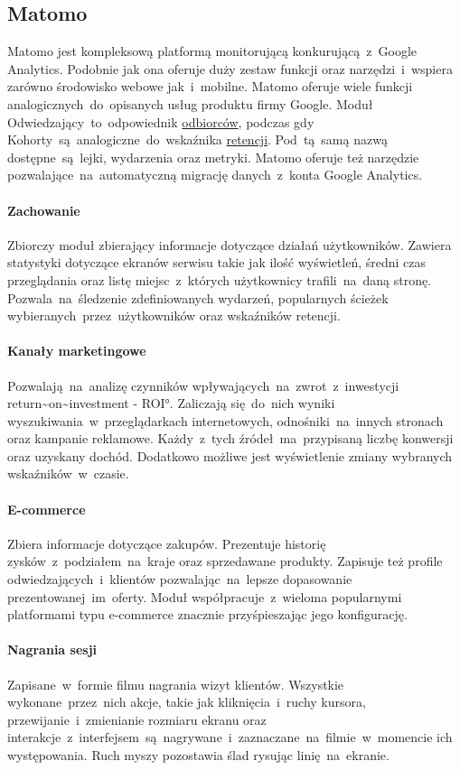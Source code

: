 \subsection{Matomo}
\label{sec:matomo}
Matomo jest kompleksową platformą monitorującą konkurującą~z~Google Analytics. Podobnie jak ona oferuje duży zestaw funkcji oraz narzędzi~i~wspiera zarówno środowisko webowe jak~i~mobilne. Matomo oferuje wiele funkcji analogicznych~do~opisanych usług produktu firmy Google. Moduł Odwiedzający~to~odpowiednik \hyperref[par:ga-audiences]{odbiorców}, podczas gdy Kohorty~są~analogiczne~do~wskaźnika \hyperref[par:ga-retention]{retencji}. Pod~tą~samą nazwą dostępne~są~lejki, wydarzenia oraz metryki. Matomo oferuje też narzędzie pozwalające~na~automatyczną migrację danych~z~konta Google Analytics.

\paragraph{Zachowanie}
Zbiorczy moduł zbierający informacje dotyczące działań użytkowników. Zawiera statystyki dotyczące ekranów serwisu takie jak ilość wyświetleń, średni czas przeglądania oraz listę miejsc~z~których użytkownicy trafili~na~daną stronę. Pozwala~na~śledzenie zdefiniowanych wydarzeń, popularnych ścieżek wybieranych~przez~użytkowników oraz wskaźników retencji.

\paragraph{Kanały marketingowe}
Pozwalają~na~analizę czynników wpływających~na~zwrot~z~inwestycji \ang{return~on~investment - ROI}. Zaliczają się~do~nich wyniki wyszukiwania~w~przeglądarkach internetowych, odnośniki~na~innych stronach oraz kampanie reklamowe. Każdy~z~tych źródeł~ma~przypisaną liczbę konwersji oraz uzyskany dochód. Dodatkowo możliwe jest wyświetlenie zmiany wybranych wskaźników~w~czasie.

\paragraph{E-commerce}
Zbiera informacje dotyczące zakupów. Prezentuje historię zysków~z~podziałem~na~kraje oraz sprzedawane produkty. Zapisuje też profile odwiedzających~i~klientów pozwalając~na~lepsze dopasowanie prezentowanej~im~oferty. Moduł współpracuje~z~wieloma popularnymi platformami typu e-commerce znacznie przyśpieszając jego konfigurację.

\paragraph{Nagrania sesji}
Zapisane~w~formie filmu nagrania wizyt klientów. Wszystkie wykonane~przez~nich akcje, takie jak kliknięcia~i~ruchy kursora, przewijanie~i~zmienianie rozmiaru ekranu oraz interakcje~z~interfejsem~są~nagrywane~i~zaznaczane~na~filmie~w~momencie ich występowania. Ruch myszy pozostawia ślad rysując linię~na~ekranie.


